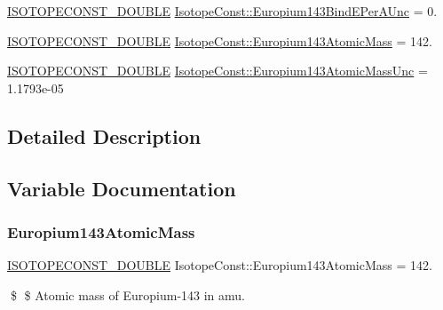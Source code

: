 \begin{DoxyCompactItemize}
\mbox{\hyperlink{group___isotope_const-_macros_ga8f45a7272ce02c0b4c65c44636ed719a}{I\+S\+O\+T\+O\+P\+E\+C\+O\+N\+S\+T\+\_\+\+D\+O\+U\+B\+LE}} \mbox{\hyperlink{group___isotope_const-_europium-_eu143_gaa8b8f836b8d76b3ef28919b546bf68d3}{Isotope\+Const\+::\+Europium143\+Bind\+E\+Per\+A\+Unc}} = 0.
\item 
\mbox{\hyperlink{group___isotope_const-_macros_ga8f45a7272ce02c0b4c65c44636ed719a}{I\+S\+O\+T\+O\+P\+E\+C\+O\+N\+S\+T\+\_\+\+D\+O\+U\+B\+LE}} \mbox{\hyperlink{group___isotope_const-_europium-_eu143_ga371596f61c8798585aedaa76df34d1d1}{Isotope\+Const\+::\+Europium143\+Atomic\+Mass}} = 142.
\item 
\mbox{\hyperlink{group___isotope_const-_macros_ga8f45a7272ce02c0b4c65c44636ed719a}{I\+S\+O\+T\+O\+P\+E\+C\+O\+N\+S\+T\+\_\+\+D\+O\+U\+B\+LE}} \mbox{\hyperlink{group___isotope_const-_europium-_eu143_gae41e0ab5d6e499af635600f8d69e57e8}{Isotope\+Const\+::\+Europium143\+Atomic\+Mass\+Unc}} = 1.\+1793e-\/05
\end{DoxyCompactItemize}


\subsection{Detailed Description}


\subsection{Variable Documentation}
\mbox{\label{group___isotope_const-_europium-_eu143_ga371596f61c8798585aedaa76df34d1d1}} 
\subsubsection{\texorpdfstring{Europium143\+Atomic\+Mass}{Europium143AtomicMass}}
{\footnotesize\ttfamily \mbox{\hyperlink{group___isotope_const-_macros_ga8f45a7272ce02c0b4c65c44636ed719a}{I\+S\+O\+T\+O\+P\+E\+C\+O\+N\+S\+T\+\_\+\+D\+O\+U\+B\+LE}} Isotope\+Const\+::\+Europium143\+Atomic\+Mass = 142.}

\$ \$ Atomic mass of Europium-\/143 in amu. \mbox{\label{group___isotope_const-_europium-_eu143_gae41e0ab5d6e499af635600f8d69e57e8}} 
